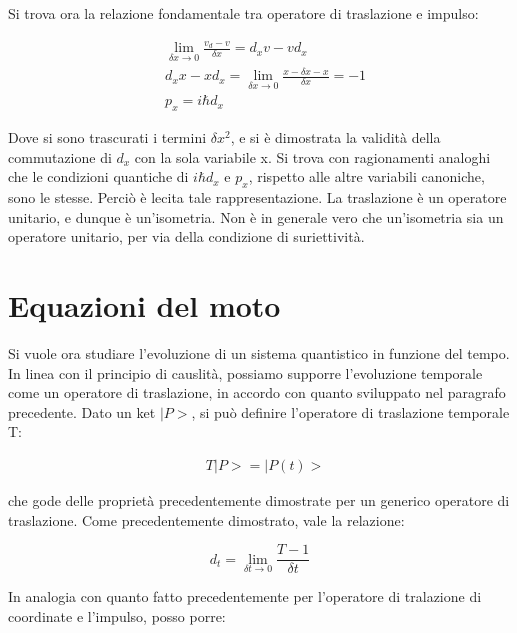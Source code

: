 \documentclass{article}
\begin{document}
Si trova ora la relazione fondamentale tra operatore di traslazione e impulso:

\begin{equation}
    \begin{aligned}
         & \lim_{\delta x \rightarrow 0} \frac{v_d-v}{\delta x}= d_xv-vd_x               \\
         & d_x x- xd_x= \lim_{\delta x \rightarrow 0} \frac{x-\delta x -x}{\delta x}= -1 \\
         & p_x= i\hbar d_x
    \end{aligned}
\end{equation}

Dove si sono trascurati i termini $\delta x^2$, e si è dimostrata la validità della commutazione di $d_x$ con la sola variabile x.
Si trova con ragionamenti analoghi che le condizioni quantiche di $i\hbar d_x$ e $p_x$, rispetto alle altre variabili canoniche, sono le stesse.
Perciò è lecita tale rappresentazione.
La traslazione è un operatore unitario, e dunque è un'isometria. Non è in generale vero che un'isometria sia un operatore unitario, per via
della condizione di suriettività.


\section{Equazioni del moto}
Si vuole ora studiare l'evoluzione di un sistema quantistico in funzione del tempo.
In linea con il principio di causlità, possiamo supporre l'evoluzione temporale come un operatore di traslazione, in accordo con quanto sviluppato
nel paragrafo precedente.
Dato un  ket $|P>$, si può definire l'operatore di traslazione temporale T:

\begin{equation}
    \begin{aligned}
         & T |P>= |P(t)>
    \end{aligned}
\end{equation}

che gode delle proprietà precedentemente dimostrate per un generico operatore di traslazione.
Come precedentemente dimostrato, vale la relazione:

\begin{equation}
    d_t= \lim_{\delta t \rightarrow 0} \frac{T-1}{\delta t}
\end{equation}

In analogia con quanto fatto precedentemente per l'operatore di tralazione di coordinate e l'impulso, posso porre:
\end{document}
